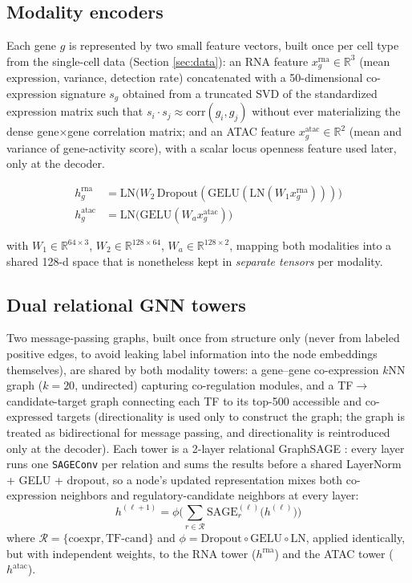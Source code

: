 \documentclass{article}
\theoremstyle{plain}
\theoremstyle{definition}
\begin{document}
\subsection{Modality encoders}
Each gene $g$ is represented by two small feature vectors, built once per cell
type from the single-cell data (Section \ref{sec:data}): an RNA feature
$x^{\text{rna}}_g \in \mathbb{R}^3$ (mean expression, variance, detection rate)
concatenated with a 50-dimensional co-expression signature $s_g$ obtained from
a truncated SVD of the standardized expression matrix such that $s_i \cdot s_j
\approx \mathrm{corr}(g_i, g_j)$ without ever materializing the dense
gene$\times$gene correlation matrix; and an ATAC feature $x^{\text{atac}}_g \in
\mathbb{R}^2$ (mean and variance of gene-activity score), with a scalar locus
openness feature used later, only at the decoder.

\begin{align}
h^{\text{rna}}_g &= \mathrm{LN}\!\big(W_2\, \mathrm{Dropout}(\mathrm{GELU}(\mathrm{LN}(W_1 x^{\text{rna}}_g)))\big) \\
h^{\text{atac}}_g &= \mathrm{LN}\!\big(\mathrm{GELU}(W_a x^{\text{atac}}_g)\big)
\end{align}

with $W_1 \in \mathbb{R}^{64\times3}$, $W_2 \in \mathbb{R}^{128\times64}$, $W_a
\in \mathbb{R}^{128\times2}$, mapping both modalities into a shared 128-d
space that is nonetheless kept in \emph{separate tensors} per modality.

\subsection{Dual relational GNN towers}
Two message-passing graphs, built once from structure only (never from labeled
positive edges, to avoid leaking label information into the node embeddings
themselves), are shared by both modality towers: a gene--gene co-expression
$k$NN graph ($k=20$, undirected) capturing co-regulation modules, and a
TF$\to$candidate-target graph connecting each TF to its top-500 accessible and
co-expressed targets (directionality is used only to construct the graph; the
graph is treated as bidirectional for message passing, and directionality is
reintroduced only at the decoder). Each tower is a 2-layer relational
GraphSAGE \cite{hamilton2017graphsage}: every layer runs one \texttt{SAGEConv}
per relation and sums the results before a shared LayerNorm + GELU + dropout,
so a node's updated representation mixes both co-expression neighbors and
regulatory-candidate neighbors at every layer:
\begin{equation}
h^{(\ell+1)} = \phi\Big(\textstyle\sum_{r \in \mathcal{R}} \mathrm{SAGE}_r^{(\ell)}\big(h^{(\ell)}\big)\Big)
\end{equation}
where $\mathcal{R} = \{\text{coexpr}, \text{TF-cand}\}$ and $\phi = \mathrm{Dropout}
\circ \mathrm{GELU} \circ \mathrm{LN}$, applied identically, but with
independent weights, to the RNA tower ($h^{\text{rna}}$) and the ATAC tower
($h^{\text{atac}}$).
\end{document}
